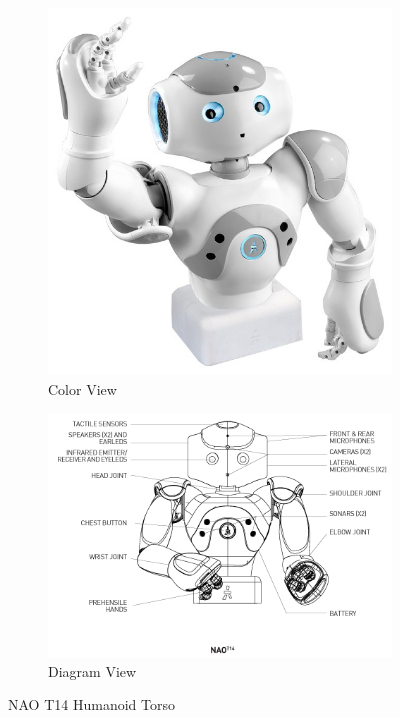 \documentclass{ut-thesis}
\begin{document}
\begin{figure} [h]
	\begin{subfigure}[b]{0.39\textwidth}
		\includegraphics[width=1.1\linewidth]{./img/nao-torso.jpg}
		\caption{Color View}
	\end{subfigure}
	\begin{subfigure}[b]{0.59\textwidth}
		\includegraphics[width=1.1\linewidth]{./img/nao_t14_schema.png}
		\caption{Diagram View}
	\end{subfigure}%
	\centering
	\caption{NAO T14 Humanoid Torso}
	\label{fig:NAOColor}
\end{figure}
\end{document}
